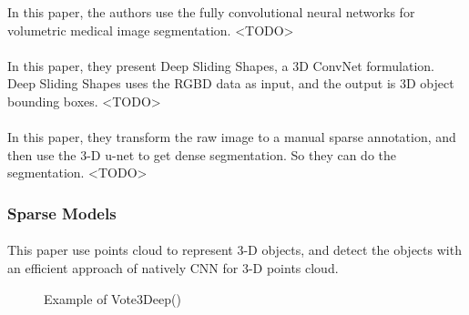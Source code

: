 \documentclass[border=0.5in]{blog}
\begin{document}
    In this paper, the authors use the fully convolutional neural networks for 
    volumetric medical image segmentation.
    <TODO>
    
    \paragraph{\citep{DBLP:journals/corr/SongX15}}
    
    In this paper, they present Deep Sliding Shapes, a 3D ConvNet formulation.
    Deep Sliding Shapes uses the RGBD data as input,
    and the output is 3D object bounding boxes.
    <TODO>
    
    \paragraph{\citep{DBLP:journals/corr/CicekALBR16}}
    
    In this paper, they transform the raw image to a manual sparse annotation,
    and then use the 3-D u-net to get dense segmentation. So they can do the segmentation.
    <TODO>
    
    
    \subsubsection{Sparse Models}
    \label{sec:rbm:3d-cnn:sm}
    
    
    \paragraph{\citep{DBLP:journals/corr/EngelckeRWTP16}}
    
    This paper use points cloud to represent 3-D objects, and detect the 
    objects with an efficient approach of natively CNN for 3-D points cloud.
    
    \begin{figure}
        \centering
        \caption{Example of Vote3Deep(\citep{DBLP:journals/corr/EngelckeRWTP16})}
        \label{fig:vote3d}
    \end{figure}
    
    \paragraph{\citep{DBLP:journals/corr/Graham14}}
    
\end{document}
